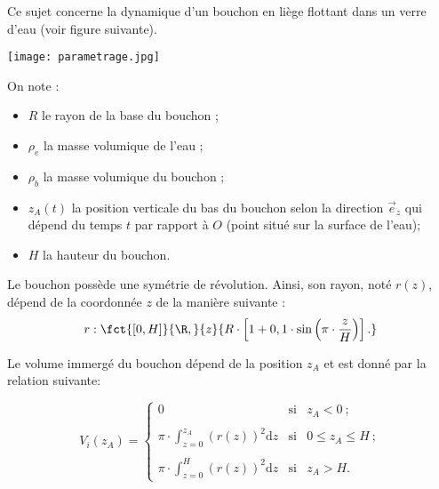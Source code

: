 
Ce sujet concerne la dynamique d'un bouchon en liège flottant dans un verre d'eau (voir figure suivante).%

\bigskip{}

\begin{minipage}{0.45\textwidth}
\begin{center}
    \texttt{[image: parametrage.jpg]}
\end{center}
\end{minipage}
\begin{minipage}{0.45\textwidth}
On note : 
\begin{itemize}
\item $R$ le rayon de la base du bouchon ;
\item $\rho_e$ la masse volumique de l'eau ;
\item $\rho_b$ la masse volumique du bouchon ;
\item $z_A(t)$ la position verticale du bas du bouchon selon la direction $\overrightarrow{e}_z$ qui dépend du temps $t$ par rapport à $O$ (point situé sur la surface de l'eau);
\item $H$ la hauteur du bouchon.
\end{itemize}
\end{minipage}

\bigskip{}

Le bouchon possède une symétrie de révolution. Ainsi, son rayon, noté $r(z)$, dépend de la coordonnée $z$ de la manière suivante : 
\begin{equation*}
    r:\fct{[0,H]}{\R,}{z}{R\cdot \left[1+0,1\cdot \sin\left(\pi\cdot\dfrac{z}{H}\right)\right].}
\end{equation*}


Le volume immergé du bouchon dépend de la position $z_A$ et est donné par la relation suivante: 

\begin{equation*}
V_i(z_A)=
\left\{
\begin{array}{rcl}
0&\text{si}& z_A < 0~;\\
\\
\pi\cdot \displaystyle\int_{z=0}^{z_A}\left(r(z)\right)^2\mathrm{d}z&\text{si}& 0\leq z_A \leq H~;\\
\\
\pi\cdot \displaystyle\int_{z=0}^{H}\left(r(z)\right)^2\mathrm{d}z&\text{si}& z_A > H.
\end{array}
\right.
\end{equation*}

